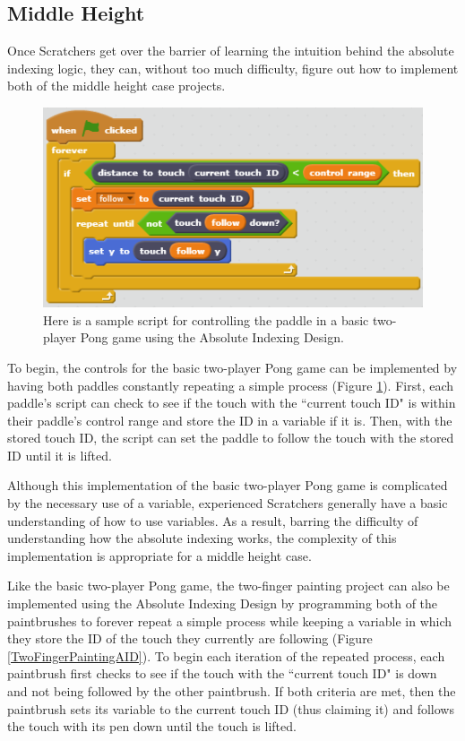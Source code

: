 \subsection{Middle Height}

Once Scratchers get over the barrier of learning the intuition behind the  absolute indexing logic, they can, without too much difficulty, figure out how to implement both of the middle height case projects.

\begin{figure}
\centering
\includegraphics{images/BasicTwoPlayerPongAID.PNG}
\caption[Sample Absolute Indexing Design Script for Basic Two-Player Pong]
{Here is a sample script for controlling the paddle in a basic two-player Pong game using the Absolute Indexing Design.}
\label{BasicTwoPlayerPongAID}
\end{figure}

To begin, the controls for the basic two-player Pong game can be implemented by having both paddles constantly repeating a simple process (Figure \ref{BasicTwoPlayerPongAID}). First, each paddle's script can check to see if the touch with the ``current touch ID" is within their paddle's control range and store the ID in a variable if it is. Then, with the stored touch ID, the script can set the paddle to follow the touch with the stored ID until it is lifted.

Although this implementation of the basic two-player Pong game is complicated by the necessary use of a variable, experienced Scratchers generally have a basic understanding of how to use variables. As a result, barring the difficulty of understanding how the absolute indexing works, the complexity of this implementation is appropriate for a middle height case.

Like the basic two-player Pong game, the two-finger painting project can also be implemented using the Absolute Indexing Design by programming both of the paintbrushes to forever repeat a simple process while keeping a variable in which they store the ID of the touch they currently are following (Figure \ref{TwoFingerPaintingAID}). To begin each iteration of the repeated process, each paintbrush first checks to see if the touch with the ``current touch ID" is down and not being followed by the other paintbrush. If both criteria are met, then the paintbrush sets its variable to the current touch ID (thus claiming it) and follows the touch with its pen down until the touch is lifted.

